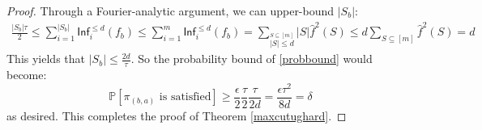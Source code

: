 \begin{proof}
Through a Fourier-analytic argument, we can upper-bound $|S_b|$:
\begin{align*}
  \frac{|S_b|\tau}{2} \leq \sum_{i = 1}^{|S_b|} \mathsf{Inf}_i^{\leq d}(f_b) \leq \sum_{i = 1}^m \mathsf{Inf}_i^{\leq d}(f_b) = \sum_{\overset{S \subseteq [m]}{|S| \leq d}} |S| \hat{f}^2(S) \leq d \sum_{S \subseteq [m]}  \hat{f}^2(S) = d
\end{align*}
This yields that $|S_b| \leq \frac{2d}{\tau}$. So the probability bound of \ref{probbound} would become:
%
\begin{equation}
  \mathbb{P}[\pi_{(b,a)} \text{ is satisfied}] \geq \frac{\epsilon}{2}\frac{\tau}{2}\frac{\tau}{2d} = \frac{\epsilon\tau^2}{8d} = \delta
\end{equation}
as desired. This completes the proof of Theorem \ref{maxcutughard}.
\end{proof}



